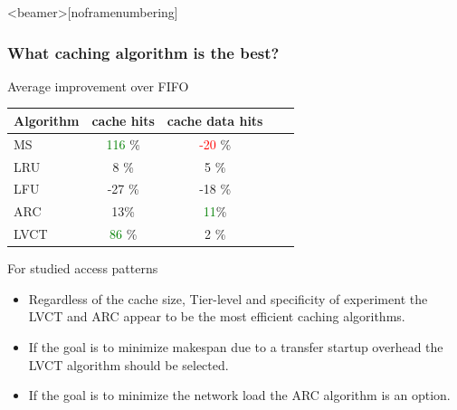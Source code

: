 \documentclass{beamer}
\begin{document}
\begin{frame}<beamer>[noframenumbering]\frametitle{What caching algorithm is the best? }
\vspace{-5mm}
  \begin{block}{Average improvement over FIFO}
	\begin{table}\begin{tabular}{|l|c|c|c|c|}
\hline
Algorithm & cache hits & cache data hits\\ \hline
MS & \textcolor{green}{116} \% & \textcolor{red}{-20} \% \\ \hline
LRU & 8 \% & 5 \% \\ \hline
LFU & -27 \% & -18 \% \\ \hline
ARC & 13\% & \textcolor{green}{11}\%\\ \hline
LVCT & \textcolor{green}{86} \%& 2 \%\\ \hline
\end{tabular}	
\end{table}
  \end{block}    
\begin{footnotesize}
\begin{block}{For studied access patterns}
\begin{itemize}
\item Regardless of the cache size, Tier-level and specificity of experiment the LVCT and ARC appear to be the most efficient  caching algorithms.
\item If the goal is to minimize makespan due to a transfer startup overhead the LVCT algorithm should be selected.
	\item If the goal is to minimize the network load the ARC algorithm is an option.
\end{itemize}
\end{block}
\end{footnotesize}  
\end{frame}
\end{document}
